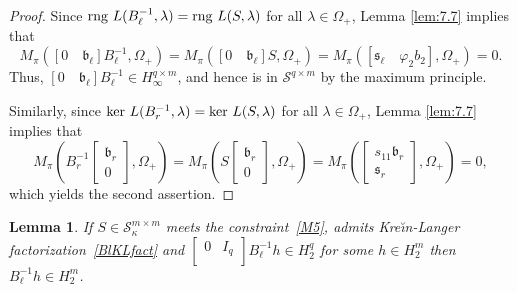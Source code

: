 \documentclass[12pt,twoside,a4paper]{amsart}
\newtheorem{lem}[thm]{Lemma}
\theoremstyle{definition}
\numberwithin{equation}{section}
\begin{document}
\begin{proof}
Since $\textup{rng }L(B_\ell^{-1},{\lambda})= \textup{rng }L(S,{\lambda})$ for all $\lambda\in\Omega_+$,
Lemma \ref{lem:7.7} implies that
$$
M_\pi([0\quad {{\mathfrak b}}_\ell]B_\ell^{-1},\Omega_+)= M_\pi([0\quad
{{\mathfrak b}}_\ell]S,\Omega_+) =M_\pi([{{\mathfrak s}}_\ell\quad
\varphi_2b_2],\Omega_+)=0.
$$
Thus, $[0\quad {{\mathfrak b}}_\ell]B_\ell^{-1}\in H_\infty^{q\times m}$, and hence is in ${{\mathcal S}}^{q\times m}$ by the maximum principle.

Similarly, since $\textup{ker }L(B_r^{-1},\lambda)=\textup{ker
}L(S,\lambda)$ for all $\lambda\in\Omega_+$, Lemma \ref{lem:7.7} implies that
$$
M_\pi(B_r^{-1}\begin{bmatrix}{{\mathfrak b}}_r\\0\end{bmatrix},\Omega_+)=
M_\pi(S\begin{bmatrix}{{\mathfrak b}}_r\\0\end{bmatrix},\Omega_+)=
M_\pi(\begin{bmatrix}s_{11}{{\mathfrak b}}_r\\ {{\mathfrak s}}_r\end{bmatrix},\Omega_+)=0,
$$
which yields the second assertion.
\end{proof}

\begin{lem}\label{lem:11.4}
If $S\in {\mathcal S}_{\kappa}^{m\times m}$ meets the constraint~\eqref{M5}, admits Kre\u{\i}n-Langer factorization~\eqref{BlKLfact}
and $\left[
       \begin{array}{cc}
         0 & I_q \\
       \end{array}
     \right]B_\ell^{-1} h\in H_2^q
$ for some $h\in H_2^m$ then $B_\ell^{-1}h\in H_2^m$.
 \end{lem}
\end{document}
